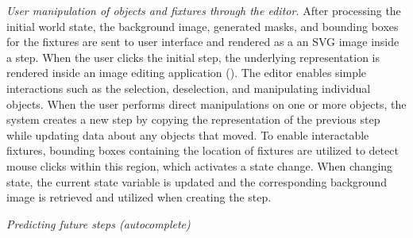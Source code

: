\noindent \emph{User manipulation of objects and fixtures through the editor.} After processing the initial world state, the background image, generated masks, and bounding boxes for the fixtures are sent to user interface and rendered as a an SVG image inside a step. When the user clicks the initial step, the underlying representation is rendered inside an image editing application (). The editor enables simple interactions such as the selection, deselection, and manipulating individual objects. When the user performs direct manipulations on one or more objects, the system creates a new step by copying the representation of the previous step while updating data about any objects that moved. To enable interactable fixtures, bounding boxes containing the location of fixtures are utilized to detect mouse clicks within this region, which activates a state change. When changing state, the current state variable is updated and the corresponding background image is retrieved and utilized when creating the step.

\noindent \emph{Predicting future steps (autocomplete)}









